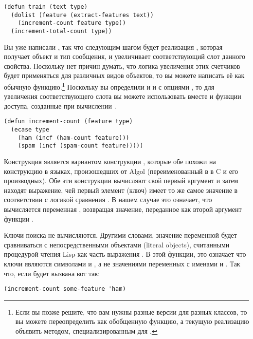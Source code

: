 \begin{lstlisting}
(defun train (text type)
  (dolist (feature (extract-features text))
    (increment-count feature type))
  (increment-total-count type))
\end{lstlisting}

Вы уже написали , так что следующим шагом будет реализация
, которая получает объект  и тип сообщения, и
увеличивает соответствующий слот данного свойства.  Поскольку нет причин думать, что
логика увеличения этих счетчиков будет применяться для различных видов объектов, то вы
можете написать её как обычную функцию.\footnote{Если вы позже решите, что вам нужны
  разные версии  для разных классов, то вы можете переопределить
   как обобщенную функцию, а текущую реализацию объявить методом,
  специализированным для .}  Поскольку вы определили и 
и  с опциями , то для увеличения соответствующего слота
вы можете использовать вместе  и функции доступа, созданные при вычислении
.

\begin{lstlisting}
(defun increment-count (feature type)
  (ecase type
    (ham (incf (ham-count feature)))
    (spam (incf (spam-count feature)))))
\end{lstlisting}

Конструкция  является вариантом конструкции , которые обе похожи на
конструкцию  в языках, произошедших от Algol (переименованный в  в
C и его производных).  Обе эти конструкции вычисляют свой первый аргумент и затем находят
выражение, чей первый элемент (ключ) имеет то же самое значение в соответствии с логикой
сравнения .  В нашем случае это означает, что вычисляется переменная
, возвращая значение, переданное как второй аргумент функции
.

Ключи поиска не вычисляются.  Другими словами, значение переменной  будет
сравниваться с непосредственными объектами (literal objects), считанными процедурой чтения
Lisp как часть выражения . В этой функции, это означает что ключи являются
символами  и , а не значениями переменных с именами  и
.  Так что, если  будет вызвана вот так:

\begin{lstlisting}
(increment-count some-feature 'ham)
\end{lstlisting}

